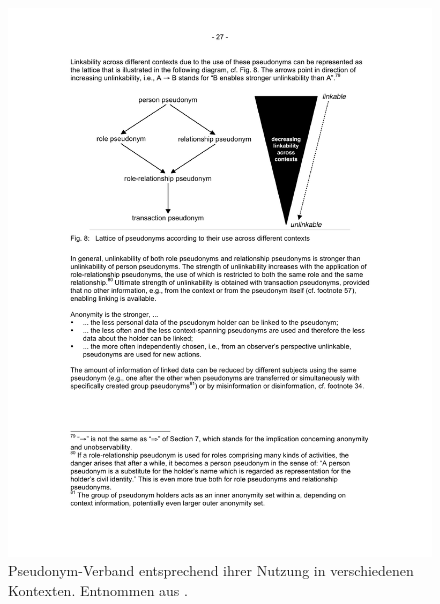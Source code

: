 \begin{figure}[]
    \centering
        \includegraphics[clip, trim=0cm 16.5cm 0cm 4cm, width=1.00\textwidth]{img/pseudonym_lattice_excerpt.pdf}
    \caption{Pseudonym-Verband entsprechend ihrer Nutzung in verschiedenen Kontexten. Entnommen aus \cite{pfitzmann2010}.}
    \label{fig:lattice_pseudonym}
\end{figure}

